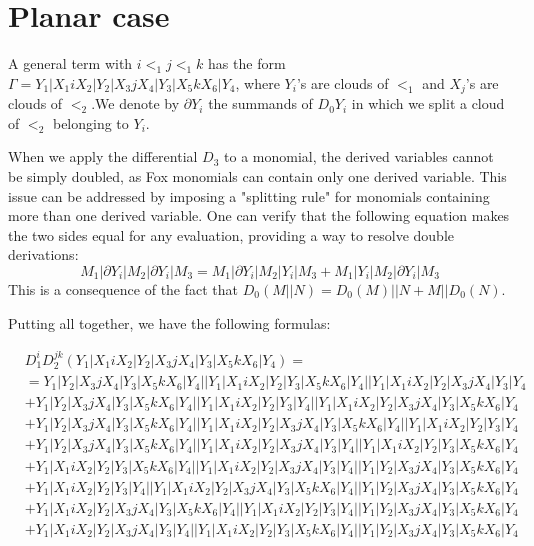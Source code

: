 \documentclass{article}[12pt]
\begin{document}
\section*{Planar case}

A general term with $i<_1 j <_1 k$ has the form $\Gamma = Y_1|X_1 iX_2|Y_2| X_3 j X_4 |Y_3|X_5 k X_6 | Y_4$, where $Y_i$'s are clouds of $<_1$ and $X_j$'s are clouds of $<_2$.We denote by $\partial Y_i$ the summands of $D_0 Y_i$ in which we split a cloud of $<_2$ belonging to $Y_i$. 

When we apply the differential $D_3$ to a monomial, the derived variables cannot be simply doubled, as Fox monomials can contain only one derived variable. This issue can be addressed by imposing a "splitting rule" for monomials containing more than one derived variable. One can verify that the following equation makes the two sides equal for any evaluation, providing a way to resolve double derivations:
$$ M_1|\partial Y_i | M_2 | \partial Y_i |M_3 = M_1|\partial Y_i | M_2 | Y_i |M_3 + M_1|Y_i | M_2 | \partial Y_i |M_3 $$
This is a consequence of the fact that $D_0(M||N)=D_0(M)||N + M||D_0(N)$. 

Putting all together, we have the following formulas:

\begin{align*}
& D_1^iD_2^{jk}(Y_1|X_1iX_2|Y_2|X_3jX_4|Y_3|X_5kX_6|Y_4) =\\
&=Y_1|Y_2|X_3jX_4|Y_3|X_5kX_6|Y_4||Y_1|X_1iX_2|Y_2|Y_3|X_5kX_6|Y_4||Y_1|X_1iX_2|Y_2|X_3jX_4|Y_3|Y_4\\ 
 & +Y_1|Y_2|X_3jX_4|Y_3|X_5kX_6|Y_4||Y_1|X_1iX_2|Y_2|Y_3|Y_4||Y_1|X_1iX_2|Y_2|X_3jX_4|Y_3|X_5kX_6|Y_4\\ 
 & +Y_1|Y_2|X_3jX_4|Y_3|X_5kX_6|Y_4||Y_1|X_1iX_2|Y_2|X_3jX_4|Y_3|X_5kX_6|Y_4||Y_1|X_1iX_2|Y_2|Y_3|Y_4\\ 
 & +Y_1|Y_2|X_3jX_4|Y_3|X_5kX_6|Y_4||Y_1|X_1iX_2|Y_2|X_3jX_4|Y_3|Y_4||Y_1|X_1iX_2|Y_2|Y_3|X_5kX_6|Y_4\\ 
 & +Y_1|X_1iX_2|Y_2|Y_3|X_5kX_6|Y_4||Y_1|X_1iX_2|Y_2|X_3jX_4|Y_3|Y_4||Y_1|Y_2|X_3jX_4|Y_3|X_5kX_6|Y_4\\ 
 & +Y_1|X_1iX_2|Y_2|Y_3|Y_4||Y_1|X_1iX_2|Y_2|X_3jX_4|Y_3|X_5kX_6|Y_4||Y_1|Y_2|X_3jX_4|Y_3|X_5kX_6|Y_4\\ 
 & +Y_1|X_1iX_2|Y_2|X_3jX_4|Y_3|X_5kX_6|Y_4||Y_1|X_1iX_2|Y_2|Y_3|Y_4||Y_1|Y_2|X_3jX_4|Y_3|X_5kX_6|Y_4\\ 
 & +Y_1|X_1iX_2|Y_2|X_3jX_4|Y_3|Y_4||Y_1|X_1iX_2|Y_2|Y_3|X_5kX_6|Y_4||Y_1|Y_2|X_3jX_4|Y_3|X_5kX_6|Y_4\end{align*}
\end{document}
